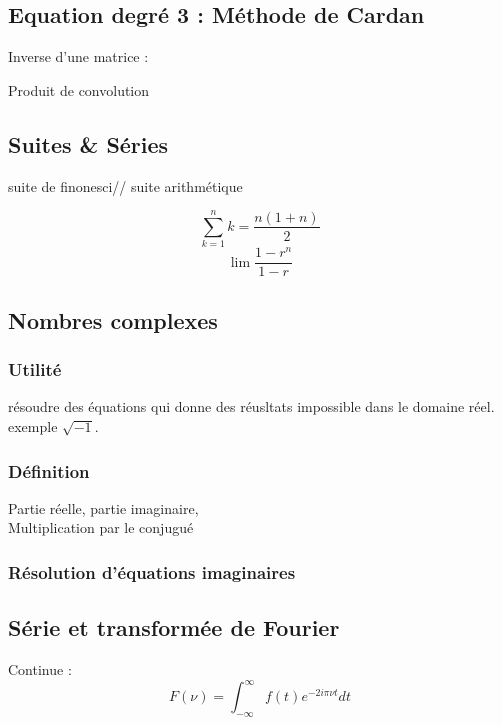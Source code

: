 \subsection{Equation degré 3 : Méthode de Cardan}

Inverse d'une matrice :

Produit de convolution

\subsection{Suites \& Séries}

suite de finonesci//
suite arithmétique

\begin{equation}
\sum_{k=1}^{n}k=\frac{n(1+n)}{2}
\end{equation}
\begin{equation}
\lim \frac{1-r^n}{1-r}
\end{equation}

\subsection{Nombres complexes}

\subsubsection{Utilité}
résoudre des équations qui donne des réusltats impossible dans le domaine réel. exemple $\sqrt{-1}$.\\
\subsubsection{Définition}
Partie réelle, partie imaginaire,\\

Multiplication par le conjugué\\

\subsubsection{Résolution d'équations imaginaires}

\subsection{Série et transformée de Fourier}
Continue :
\begin{equation}
F(\nu)=\int_{-\infty}^{\infty} f(t) e^{-2 i \pi \nu t} dt
\end{equation}

